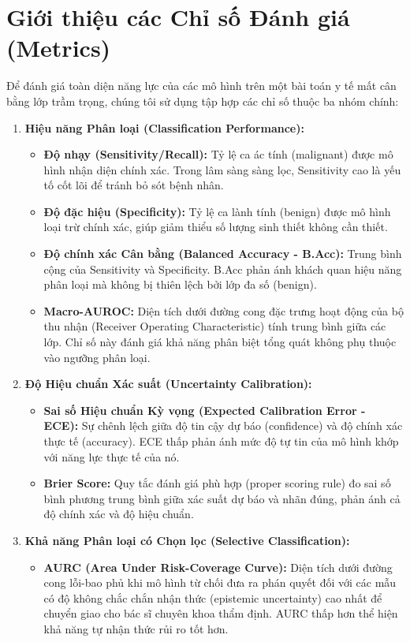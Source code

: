 \documentclass[11pt, a4paper]{article}
\begin{document}
\section{Giới thiệu các Chỉ số Đánh giá (Metrics)}
Để đánh giá toàn diện năng lực của các mô hình trên một bài toán y tế mất cân bằng lớp trầm trọng, chúng tôi sử dụng tập hợp các chỉ số thuộc ba nhóm chính:
\begin{enumerate}
    \item \textbf{Hiệu năng Phân loại (Classification Performance):}
    \begin{itemize}
        \item \textbf{Độ nhạy (Sensitivity/Recall):} Tỷ lệ ca ác tính (malignant) được mô hình nhận diện chính xác. Trong lâm sàng sàng lọc, Sensitivity cao là yếu tố cốt lõi để tránh bỏ sót bệnh nhân.
        \item \textbf{Độ đặc hiệu (Specificity):} Tỷ lệ ca lành tính (benign) được mô hình loại trừ chính xác, giúp giảm thiểu số lượng sinh thiết không cần thiết.
        \item \textbf{Độ chính xác Cân bằng (Balanced Accuracy - B.Acc):} Trung bình cộng của Sensitivity và Specificity. B.Acc phản ánh khách quan hiệu năng phân loại mà không bị thiên lệch bởi lớp đa số (benign).
        \item \textbf{Macro-AUROC:} Diện tích dưới đường cong đặc trưng hoạt động của bộ thu nhận (Receiver Operating Characteristic) tính trung bình giữa các lớp. Chỉ số này đánh giá khả năng phân biệt tổng quát không phụ thuộc vào ngưỡng phân loại.
    \end{itemize}
    \item \textbf{Độ Hiệu chuẩn Xác suất (Uncertainty Calibration):}
    \begin{itemize}
        \item \textbf{Sai số Hiệu chuẩn Kỳ vọng (Expected Calibration Error - ECE):} Sự chênh lệch giữa độ tin cậy dự báo (confidence) và độ chính xác thực tế (accuracy). ECE thấp phản ánh mức độ tự tin của mô hình khớp với năng lực thực tế của nó.
        \item \textbf{Brier Score:} Quy tắc đánh giá phù hợp (proper scoring rule) đo sai số bình phương trung bình giữa xác suất dự báo và nhãn đúng, phản ánh cả độ chính xác và độ hiệu chuẩn.
    \end{itemize}
    \item \textbf{Khả năng Phân loại có Chọn lọc (Selective Classification):}
    \begin{itemize}
        \item \textbf{AURC (Area Under Risk-Coverage Curve):} Diện tích dưới đường cong lỗi-bao phủ khi mô hình từ chối đưa ra phán quyết đối với các mẫu có độ không chắc chắn nhận thức (epistemic uncertainty) cao nhất để chuyển giao cho bác sĩ chuyên khoa thẩm định. AURC thấp hơn thể hiện khả năng tự nhận thức rủi ro tốt hơn.
    \end{itemize}
\end{enumerate}
\end{document}
